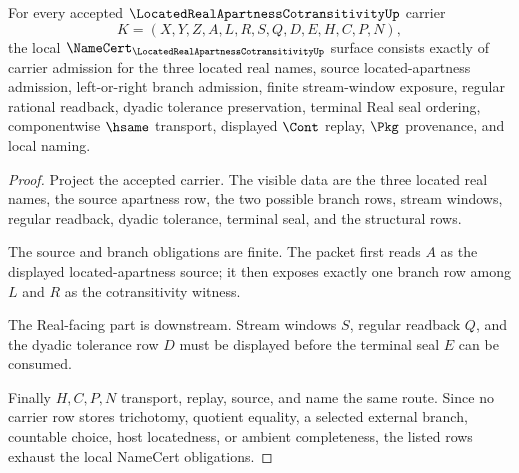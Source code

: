 \begin{theorem}
\label{thm:located-real-apartness-cotransitivity-namecert-obligations}
For every accepted $\LocatedRealApartnessCotransitivityUp$ carrier
$$
K=(X,Y,Z,A,L,R,S,Q,D,E,H,C,P,N),
$$
the local $\NameCert_{\LocatedRealApartnessCotransitivityUp}$ surface consists exactly of carrier admission for the three located real names, source located-apartness admission, left-or-right branch admission, finite stream-window exposure, regular rational readback, dyadic tolerance preservation, terminal Real seal ordering, componentwise $\hsame$ transport, displayed $\Cont$ replay, $\Pkg$ provenance, and local naming.
\end{theorem}
\begin{proof}
Project the accepted carrier. The visible data are the three located real names, the source apartness row, the two possible branch rows, stream windows, regular readback, dyadic tolerance, terminal seal, and the structural rows.

The source and branch obligations are finite. The packet first reads $A$ as the displayed located-apartness source; it then exposes exactly one branch row among $L$ and $R$ as the cotransitivity witness.

The Real-facing part is downstream. Stream windows $S$, regular readback $Q$, and the dyadic tolerance row $D$ must be displayed before the terminal seal $E$ can be consumed.

Finally $H,C,P,N$ transport, replay, source, and name the same route. Since no carrier row stores trichotomy, quotient equality, a selected external branch, countable choice, host locatedness, or ambient completeness, the listed rows exhaust the local NameCert obligations.
\end{proof}

